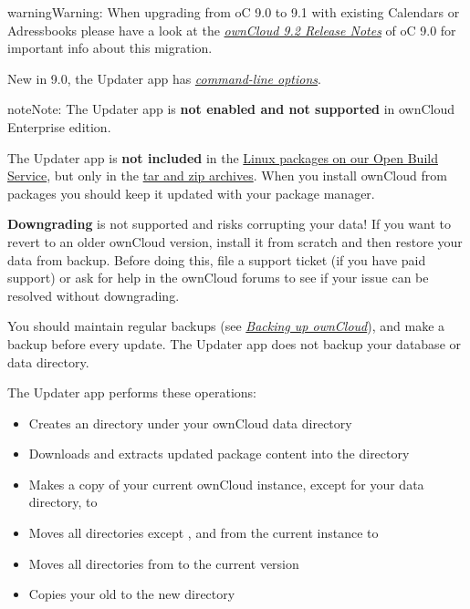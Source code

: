 \documentclass[letterpaper,10pt,english]{sphinxmanual}
\begin{document}
\begin{notice}{warning}{Warning:}
When upgrading from oC 9.0 to 9.1 with existing Calendars or Adressbooks
please have a look at the {\hyperref[release_notes::doc]{\emph{\emph{ownCloud 9.2 Release Notes}}}} of oC 9.0 for important info
about this migration.
\end{notice}

New in 9.0, the Updater app has {\hyperref[maintenance/update:updater\string-cli\string-label]{\emph{command-line options}}}.

\begin{notice}{note}{Note:}
The Updater app is \textbf{not enabled and not supported} in ownCloud
Enterprise edition.

The Updater app is \textbf{not included} in the
\href{https://download.owncloud.org/download/repositories/stable/owncloud/}{Linux packages on our Open Build Service},
but only in the \href{https://owncloud.org/install/\#instructions-server}{tar and zip archives}. When you install
ownCloud from packages you should keep it updated with your package manager.

\textbf{Downgrading} is not supported and risks corrupting your data! If you want
to revert to an older ownCloud version, install it from scratch and then
restore your data from backup. Before doing this, file a support ticket (if
you have paid support) or ask for help in the ownCloud forums to see if your
issue can be resolved without downgrading.
\end{notice}

You should maintain regular backups (see {\hyperref[maintenance/backup::doc]{\emph{\emph{Backing up ownCloud}}}}), and make a backup
before every update. The Updater app does not backup your database or data
directory.

The Updater app performs these operations:
\begin{itemize}
\item {} 
Creates an  directory under your ownCloud data directory

\item {} 
Downloads and extracts updated package content into the
 directory

\item {} 
Makes a copy of your current ownCloud instance, except for your data
directory, to 

\item {} 
Moves all directories except ,  and  from the
current instance to 

\item {} 
Moves all directories from  to the current
version

\item {} 
Copies your old  to the new  directory

\end{itemize}
\end{document}
